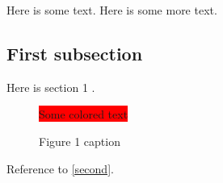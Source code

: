 %
%

%
%


\startdocument			%
%
%

Here is some text.
Here is some more text.

\subsection{First subsection}
Here is section 1 \label{first}.
\begin{figure}
\colorbox{red}{Some colored text}
\caption[List of figure caption]{Figure 1 caption}
\end{figure}

%
%

Reference to \ref{second}.

%
%
